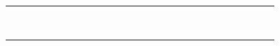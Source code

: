 \documentclass{article}
\renewcommand\_{\textunderscore\allowbreak}
\newcommand{\tagmcend}{}
\begin{document}
\begin{table}
\begin{tabular}{p{4.5cm}*{26}{D}}
\anonstrut\textcolor{codelabel}{} & \X &  &  &  &  &  &  &  &  &  & \X &  &  &  &  &  &  &  &  &  & \X &  &  &  &  &  \\
\anonstrut\textcolor{codelabel}{} &  & \X &  &  &  &  &  &  &  &  &  & \X &  &  &  &  &  &  &  &  & \X &  &  &  &  &  \\
\anonstrut\textcolor{codelabel}{} & \X &  & \X &  &  &  &  &  &  &  &  & \X &  &  &  &  &  &  &  &  & \X &  &  &  &  &  \\
\anonstrut\textcolor{codelabel}{} & \X &  & \X &  & \X & \X &  &  &  &  & \X &  &  &  &  &  &  &  &  &  & \X &  &  &  &  &  \\
\anonstrut\textcolor{codelabel}{} & \X &  & \X &  & \X & \X & \X & \X &  &  & \X &  &  &  &  &  &  &  &  &  & \X &  & \X &  &  &  \\
\anonstrut\textcolor{codelabel}{} &  & \X &  &  &  &  &  &  &  &  &  & \X &  &  &  &  &  &  &  &  & \X &  &  &  &  &  \\
\anonstrut\textcolor{codelabel}{} &  & \X &  &  &  &  &  &  &  &  & \X &  &  &  &  &  &  &  &  &  & \X &  &  &  &  &  \\
\anonstrut\textcolor{codelabel}{} &  & \X &  &  &  &  &  &  &  &  & \X &  &  &  &  &  &  &  &  &  & \X &  &  &  &  &  \\
\anonstrut\textcolor{codelabel}{} & \X &  &  &  &  &  & \X &  &  &  &  & \X &  &  &  &  &  &  &  &  & \X & \X &  &  &  &  \\
\bottomrule
\end{tabular}
\end{table}
\tagmcend
 
 
\end{document}

